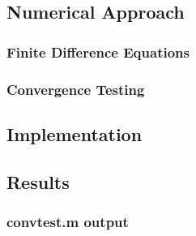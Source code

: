 \documentclass[10pt]{article}
\begin{document}
\pagebreak

\subsection*{Numerical Approach}

\subsubsection*{Finite Difference Equations}


\subsubsection*{Convergence Testing}


\pagebreak

\subsection*{Implementation}





\pagebreak

\subsection*{Results}

\subsubsection*{convtest.m output}
\end{document}
